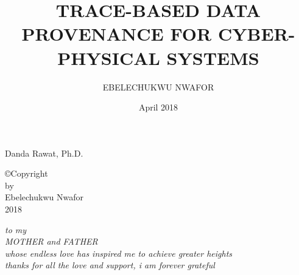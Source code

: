 \documentclass[12pt]{report}
\begin{document}

\setcounter{tocdepth}{2}


\title{TRACE-BASED DATA PROVENANCE FOR CYBER-PHYSICAL SYSTEMS}

\author{EBELECHUKWU NWAFOR}
\date{April 2018}

                 {Danda Rawat, Ph.D.}
               
                 
				


\makesigpage

\begin{CenteredPage}
\copyright Copyright\\[0.2in]
by\\[0.2in]
Ebelechukwu Nwafor\\[0.2in]
2018
\end{CenteredPage}

\begin{CenteredPage}
{\it to my\\[0.2in]
MOTHER and FATHER\\[0.2in]
whose endless love has inspired me to achieve greater heights \\ [0.2in]
thanks for all the love and support, i am forever grateful}
\end{CenteredPage}
\maketitlepage
\end{document}

